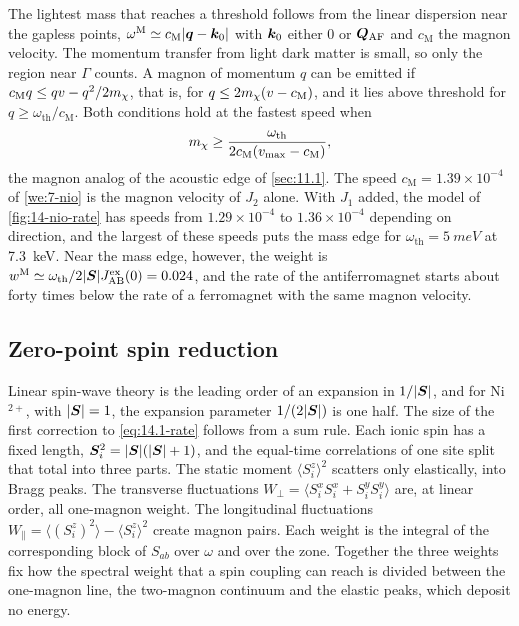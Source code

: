 The lightest mass that reaches a threshold follows from the linear dispersion near the gapless points, $\omega^{\mathrm{M}} \simeq c_{\mathrm{M}}|\bm{q} - \bm{k}_0|$ with $\bm{k}_0$ either $0$ or $\bm{Q}_{\mathrm{AF}}$ and $c_{\mathrm{M}}$ the magnon velocity. The momentum transfer from light dark matter is small, so only the region near $\Gamma$ counts. A magnon of momentum $q$ can be emitted if $c_{\mathrm{M}}q \le qv - q^2/2m_{\chi}$, that is, for $q \le 2m_{\chi}(v - c_{\mathrm{M}})$, and it lies above threshold for $q \ge \omega_{\mathrm{th}}/c_{\mathrm{M}}$. Both conditions hold at the fastest speed when
\begin{equation}
  m_{\chi} \ge \frac{\omega_{\mathrm{th}}}{2c_{\mathrm{M}}(v_{\mathrm{max}} - c_{\mathrm{M}})} ,
  \label{eq:14.1-mmin}
\end{equation}
the magnon analog of the acoustic edge of \cref{sec:11.1}. The speed $c_{\mathrm{M}} = 1.39\times10^{-4}$ of \cref{we:7-nio} is the magnon velocity of $J_2$ alone. With $J_1$ added, the model of \cref{fig:14-nio-rate} has speeds from $1.29\times10^{-4}$ to $1.36\times10^{-4}$ depending on direction, and the largest of these speeds puts the mass edge for $\omega_{\mathrm{th}} = \SI{5}{meV}$ at \SI{7.3}{keV}. Near the mass edge, however, the weight is $w^{\mathrm{M}} \simeq \omega_{\mathrm{th}}/2|\bm{S}|J^{\mathrm{ex}}_{\mathrm{AB}}(0) = 0.024$, and the rate of the antiferromagnet starts about forty times below the rate of a ferromagnet with the same magnon velocity.

\subsection{Zero-point spin reduction}

Linear spin-wave theory is the leading order of an expansion in $1/|\bm{S}|$, and for Ni$^{2+}$, with $|\bm{S}| = 1$, the expansion parameter $1/(2|\bm{S}|)$ is one half. The size of the first correction to \cref{eq:14.1-rate} follows from a sum rule. Each ionic spin has a fixed length, $\bm{S}_i^2 = |\bm{S}|(|\bm{S}| + 1)$, and the equal-time correlations of one site split that total into three parts. The static moment $\langle S^z_i\rangle^2$ scatters only elastically, into Bragg peaks. The transverse fluctuations $W_\perp = \langle S^x_iS^x_i + S^y_iS^y_i\rangle$ are, at linear order, all one-magnon weight. The longitudinal fluctuations $W_\parallel = \langle(S^z_i)^2\rangle - \langle S^z_i\rangle^2$ create magnon pairs. Each weight is the integral of the corresponding block of $S_{ab}$ over $\omega$ and over the zone. Together the three weights fix how the spectral weight that a spin coupling can reach is divided between the one-magnon line, the two-magnon continuum and the elastic peaks, which deposit no energy.

